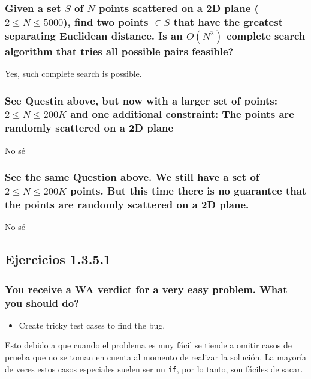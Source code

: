 \documentclass{article}
\begin{document}
\subsubsection{Given a set $S$ of $N$ points scattered on a 2D plane ($2 \leq N \leq 5000$), find two points $\in S$ that have the greatest separating Euclidean distance. Is an $O(N^{2})$ complete search algorithm that tries all possible pairs feasible?}

Yes, such complete search is possible.


\subsubsection{See Questin above, but now with a larger set of points: $2 \leq N \leq 200 K$ and one additional constraint: The points are randomly scattered on a 2D plane}

No sé


\subsubsection{See the same Question above. We still have a set of $2 \leq N \leq 200K$ points. But this time there is no guarantee that the points are randomly scattered on a 2D plane.}

No sé


\subsection{Ejercicios 1.3.5.1}


\subsubsection{You receive a WA verdict for a very easy problem. What you should do?}


\begin{itemize}
  \item Create tricky test cases to find the bug.
\end{itemize}

Esto debido a que cuando el problema es muy fácil se tiende a omitir casos de prueba que no se toman en cuenta al momento de realizar la solución. La mayoría de veces estos casos especiales suelen ser un \texttt{if}, por lo tanto, son fáciles de sacar.


\subsubsection{}
\end{document}
